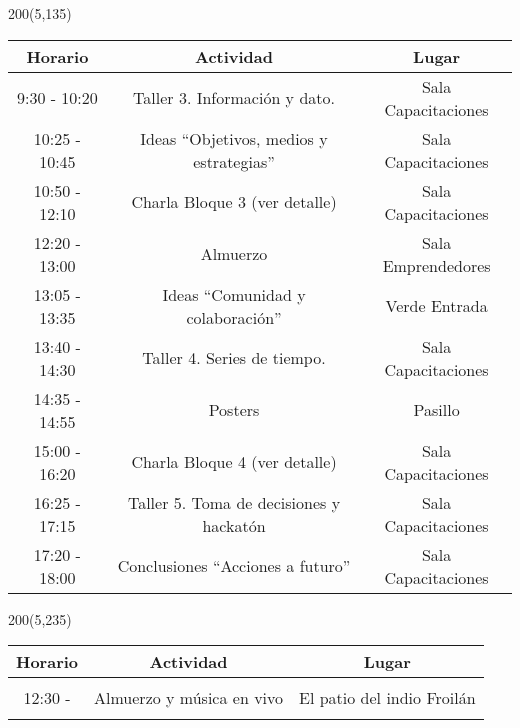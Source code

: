 \documentclass[a4paper,12pt]{article}
\begin{document}
\begin{textblock}{200}(5,135) \centering


\scalebox{1.4}{\large Sábado 5 de Agosto}

\selectfont

\large
\begin{tabular}{ccc}
\hline
\rowcolor{gray!20} \textbf{Horario} &  \hspace{2.8cm} \textbf{Actividad} \hspace{2.8cm}  &  \phantom{.}\hspace{2.9cm} \textbf{Lugar} \hspace{2.9cm} \\
\hline \hline
9:30 - 10:20 & Taller 3. Información y dato. & Sala Capacitaciones \\
\hline
\rowcolor{gray!10}
10:25 - 10:45 & Ideas ``Objetivos, medios y estrategias'' & Sala Capacitaciones \\
\hline
10:50 - 12:10 & Charla Bloque 3 (ver detalle) & Sala Capacitaciones \\
\hline
\hline
\rowcolor{gray!10}
 12:20 - 13:00 & Almuerzo & Sala Emprendedores \\
\rowcolor{gray!10}
 13:05 - 13:35 & Ideas ``Comunidad y colaboración'' & Verde Entrada \\
\hline
\hline
13:40 - 14:30 & Taller 4. Series de tiempo. & Sala Capacitaciones \\
\hline
\rowcolor{gray!10}
14:35 - 14:55 & Posters & Pasillo \\
\hline
15:00 - 16:20 & Charla Bloque 4 (ver detalle) & Sala Capacitaciones \\
\hline
\rowcolor{gray!10}
16:25 - 17:15 & Taller 5. Toma de decisiones y hackatón & Sala Capacitaciones \\
\hline
17:20 - 18:00 & Conclusiones ``Acciones a futuro'' & Sala Capacitaciones \\
\hline
\end{tabular}

\end{textblock}



\begin{textblock}{200}(5,235) \centering


\scalebox{1.4}{\large Domingo 6 de Agosto}

\selectfont

\large
\begin{tabular}{ccc}
\hline
\rowcolor{gray!20} \textbf{Horario} &  \hspace{2.8cm} \textbf{Actividad} \hspace{2.8cm}  &  \phantom{.}\hspace{2.9cm} \textbf{Lugar} \hspace{2.9cm} \\
\hline \hline
& & \\
12:30 -  & Almuerzo y música en vivo & El patio del indio Froilán \\
  &  &  \\
\hline
\end{tabular}

\end{textblock}
\end{document}
